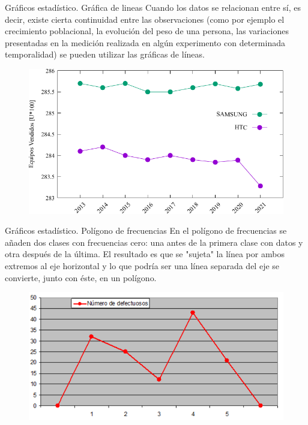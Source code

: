 \documentclass[11pt]{beamer}
\begin{document}
      \begin{frame}{Gráficos estadístico. Gráfica de lineas}
          Cuando los datos se relacionan entre sí, es decir, existe cierta continuidad entre las observaciones (como por ejemplo el crecimiento poblacional, la evolución del peso de una persona, las variaciones presentadas en la medición realizada en algún experimento con determinada temporalidad) se pueden utilizar las gráficas de líneas.
          \begin{figure}
              \centering
              \includegraphics[width=0.6\linewidth]{images/Lecture_1h}
              \label{fig:lecture1hh}
          \end{figure}

      \end{frame}

       \begin{frame}{Gráficos estadístico. Polígono de frecuencias}
          En el polígono de frecuencias se añaden dos clases con frecuencias cero: una antes de la primera clase con datos y otra después de la última. El resultado es que se "sujeta" la línea por ambos extremos al eje horizontal y lo que podría ser una línea separada del eje se convierte, junto con éste, en un polígono.
         \begin{figure}
             \centering
             \includegraphics[width=0.6\linewidth]{images/graficos_poligonodef}
             \label{fig:graficospoligonodef}
         \end{figure}

      \end{frame}
\end{document}
